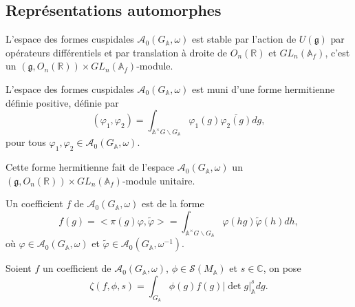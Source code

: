 \subsection{Représentations automorphes}

L'espace des formes cuspidales $\mathcal{A}_0(G_\mathbb{A}, \omega)$ est stable par l'action de $U(\mathfrak{g})$ par opérateurs différentiels et par translation à droite de $O_n(\mathbb{R})$ et $GL_n(\mathbb{A}_f)$, c'est un $(\mathfrak{g}, O_n(\mathbb{R})) \times GL_n(\mathbb{A}_f)$-module.

\begin{proposition}
\label{unitaire}
L'espace des formes cuspidales $\mathcal{A}_0(G_\mathbb{A}, \omega)$ est muni d'une forme hermitienne définie positive, définie par
\begin{equation}
(\varphi_1, \varphi_2) = \int_{\mathbb{A}^\times G \backslash G_\mathbb{A}} \varphi_1(g)\overline{\varphi_2(g)}dg,
\end{equation}
pour tous $\varphi_1, \varphi_2 \in \mathcal{A}_0(G_\mathbb{A}, \omega)$.

Cette forme hermitienne fait de l'espace $\mathcal{A}_0(G_\mathbb{A}, \omega)$ un $(\mathfrak{g}, O_n(\mathbb{R})) \times GL_n(\mathbb{A}_f)$-module unitaire.
\end{proposition}

Un coefficient $f$ de $\mathcal{A}_0(G_\mathbb{A}, \omega)$ est de la forme
\begin{equation}
f(g) = <\pi(g)\varphi, \tilde{\varphi}> = \int_{\mathbb{A}^\times G \backslash G_\mathbb{A}} \varphi(hg) \tilde{\varphi}(h) dh,
\end{equation}
où $\varphi \in \mathcal{A}_0(G_\mathbb{A}, \omega)$ et $\tilde{\varphi} \in \mathcal{A}_0(G_\mathbb{A}, \omega^{-1})$.

\begin{definition}
Soient $f$ un coefficient de $\mathcal{A}_0(G_\mathbb{A}, \omega)$, $\phi \in \mathcal{S}(M_\mathbb{A})$ et $s \in \mathbb{C}$, on pose
\begin{equation}
\zeta(f, \phi, s) = \int_{G_\mathbb{A}} \phi(g) f(g) |\det g|_\mathbb{A}^s dg.
\end{equation}
\end{definition}

